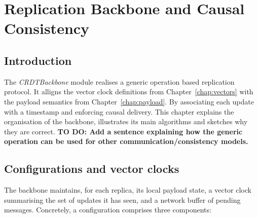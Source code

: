 
\chapter{Replication Backbone and Causal Consistency}\label{chap:backbone}

\section{Introduction}

The \textit{CRDTBackbone} module realises a generic operation based replication protocol.  
It alligns the vector clock definitions from Chapter~\ref{chap:vectors} with the payload semantics from Chapter~\ref{chap:payload}.  
By associating each update with a timestamp and enforcing causal delivery.  
This chapter explains the organisation of the backbone, illustrates its main algorithms and sketches why they are correct.
\textbf{TO DO: Add a sentence explaining how the generic operation can be used for other communication/consistency models.}

\section{Configurations and vector clocks}

The backbone maintains, for each replica, its local payload state, a vector clock summarising the set of updates it has seen, and a network buffer of pending messages.  
Concretely, a configuration comprises three components:

